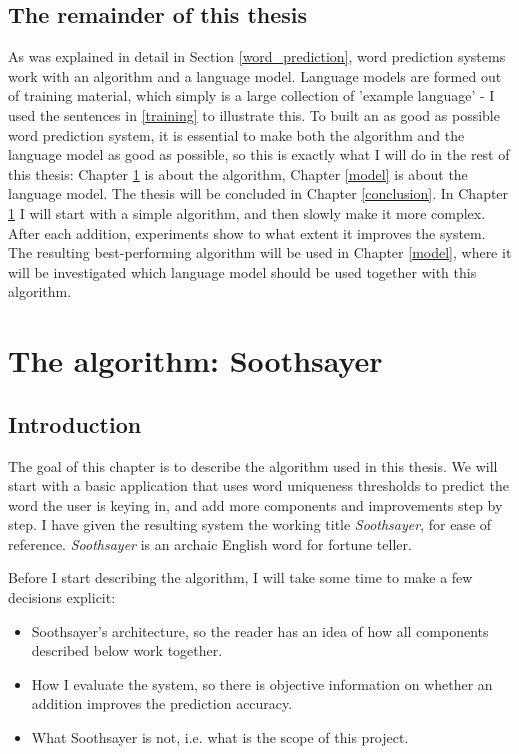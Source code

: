\documentclass[11pt]{article}
\let\stdsection\section
\renewcommand\section{\newpage\stdsection}
\begin{document}
\subsection{The remainder of this thesis} \label{restofthisthesis}
As was explained in detail in Section \ref{word_prediction}, word prediction systems work with an algorithm and a language model. Language models are formed out of training material, which simply is a large collection of 'example language' - I used the sentences in \ref{training} to illustrate this. To built an as good as possible word prediction system, it is essential to make both the algorithm and the language model as good as possible, so this is exactly what I will do in the rest of this thesis: Chapter \ref{algorithm} is about the algorithm, Chapter \ref{model} is about the language model. The thesis will be concluded in Chapter \ref{conclusion}. In Chapter \ref{algorithm} I will start with a simple algorithm, and then slowly make it more complex. After each addition, experiments show to what extent it improves the system. The resulting best-performing algorithm will be used in Chapter \ref{model}, where it will be investigated which language model should be used together with this algorithm. 





\section{The algorithm: Soothsayer} \label{algorithm}

\subsection{Introduction}

The goal of this chapter is to describe the algorithm used in this thesis. We will start with a basic application that uses word uniqueness thresholds to predict the word the user is keying in, and add more components and improvements step by step. I have given the resulting system the working title \emph{Soothsayer}, for ease of reference. \emph{Soothsayer} is an archaic English word for fortune teller.

Before I start describing the algorithm, I will take some time to make a few decisions explicit: 

\begin{itemize}
\item Soothsayer's architecture, so the reader has an idea of how all components described below work together.
\item How I evaluate the system, so there is objective information on whether an addition improves the prediction accuracy.
\item What Soothsayer is not, i.e. what is the scope of this project.
\end{itemize}
\end{document}
